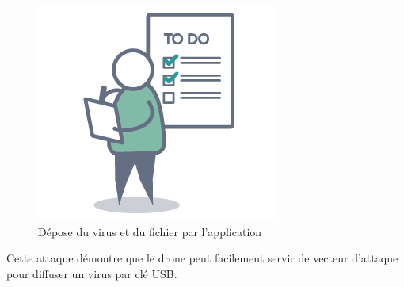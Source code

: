 \begin{figure}[H]
  \centering
  \includegraphics[scale=0.3]{images/todo.png}
  \caption{Dépose du virus et du fichier par l'application}
\end{figure}

Cette attaque démontre que le drone peut facilement servir de vecteur d'attaque pour diffuser un virus par clé USB.
